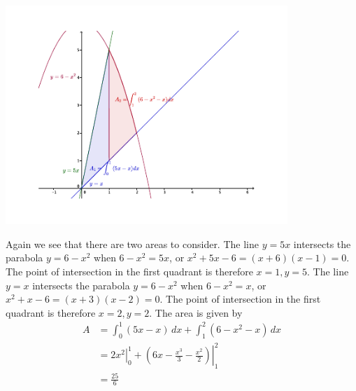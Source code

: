 \documentclass[12pt]{article}
\begin{document}
\begin{enumerate}
\begin{enumerate}
  \begin{center}
 \includegraphics[width=0.8\textwidth]{WS4-1f}
\end{center}

Again we see that there are two areas to consider. The line $y=5x$ intersects the parabola $y=6-x^2$ when $6-x^2=5x$, or $x^2+5x-6 = (x+6)(x-1)=0$. The point of intersection in the first quadrant is therefore $x=1, y=5$. The line $y=x$ intersects the parabola $y=6-x^2$ when $6-x^2=x$, or $x^2+x-6=(x+3)(x-2)=0$. The point of intersection in the first quadrant is therefore $x=2, y=2$. The area is given by
\begin{align*}
 A & = \int_0^1(5x-x)\,dx + \int_1^2(6-x^2-x)\,dx\\
&=\left.2x^2\right|_0^1 + \left.\left(6x-\frac{x^3}{3}-\frac{x^2}{2}\right)\right|_1^2\\
&=\frac{25}{6}
\end{align*}
\end{enumerate}
\end{enumerate}
\end{document}

